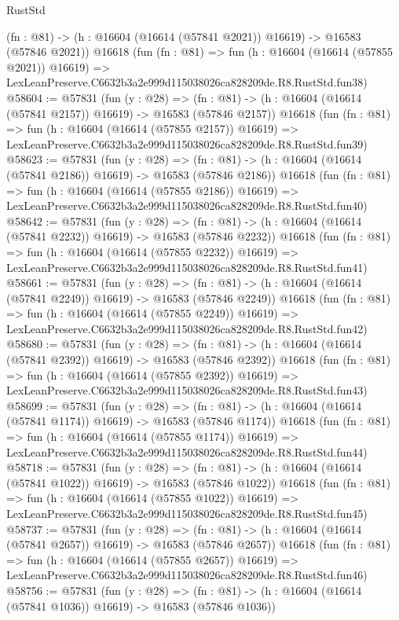 \begin{lexlean}{RustStd}
\begin{coremodule}
    (fn : @81) -> (h : @16604 (@16614 (@57841 @2021)) @16619) -> @16583 (@57846 @2021))
    @16618
    (fun (fn : @81) =>
    fun (h : @16604 (@16614 (@57855 @2021)) @16619) =>
    LexLeanPreserve.C6632b3a2e999d115038026ca828209de.R8.RustStd.fun38)
@58604 := @57831
    (fun (y : @28) =>
    (fn : @81) -> (h : @16604 (@16614 (@57841 @2157)) @16619) -> @16583 (@57846 @2157))
    @16618
    (fun (fn : @81) =>
    fun (h : @16604 (@16614 (@57855 @2157)) @16619) =>
    LexLeanPreserve.C6632b3a2e999d115038026ca828209de.R8.RustStd.fun39)
@58623 := @57831
    (fun (y : @28) =>
    (fn : @81) -> (h : @16604 (@16614 (@57841 @2186)) @16619) -> @16583 (@57846 @2186))
    @16618
    (fun (fn : @81) =>
    fun (h : @16604 (@16614 (@57855 @2186)) @16619) =>
    LexLeanPreserve.C6632b3a2e999d115038026ca828209de.R8.RustStd.fun40)
@58642 := @57831
    (fun (y : @28) =>
    (fn : @81) -> (h : @16604 (@16614 (@57841 @2232)) @16619) -> @16583 (@57846 @2232))
    @16618
    (fun (fn : @81) =>
    fun (h : @16604 (@16614 (@57855 @2232)) @16619) =>
    LexLeanPreserve.C6632b3a2e999d115038026ca828209de.R8.RustStd.fun41)
@58661 := @57831
    (fun (y : @28) =>
    (fn : @81) -> (h : @16604 (@16614 (@57841 @2249)) @16619) -> @16583 (@57846 @2249))
    @16618
    (fun (fn : @81) =>
    fun (h : @16604 (@16614 (@57855 @2249)) @16619) =>
    LexLeanPreserve.C6632b3a2e999d115038026ca828209de.R8.RustStd.fun42)
@58680 := @57831
    (fun (y : @28) =>
    (fn : @81) -> (h : @16604 (@16614 (@57841 @2392)) @16619) -> @16583 (@57846 @2392))
    @16618
    (fun (fn : @81) =>
    fun (h : @16604 (@16614 (@57855 @2392)) @16619) =>
    LexLeanPreserve.C6632b3a2e999d115038026ca828209de.R8.RustStd.fun43)
@58699 := @57831
    (fun (y : @28) =>
    (fn : @81) -> (h : @16604 (@16614 (@57841 @1174)) @16619) -> @16583 (@57846 @1174))
    @16618
    (fun (fn : @81) =>
    fun (h : @16604 (@16614 (@57855 @1174)) @16619) =>
    LexLeanPreserve.C6632b3a2e999d115038026ca828209de.R8.RustStd.fun44)
@58718 := @57831
    (fun (y : @28) =>
    (fn : @81) -> (h : @16604 (@16614 (@57841 @1022)) @16619) -> @16583 (@57846 @1022))
    @16618
    (fun (fn : @81) =>
    fun (h : @16604 (@16614 (@57855 @1022)) @16619) =>
    LexLeanPreserve.C6632b3a2e999d115038026ca828209de.R8.RustStd.fun45)
@58737 := @57831
    (fun (y : @28) =>
    (fn : @81) -> (h : @16604 (@16614 (@57841 @2657)) @16619) -> @16583 (@57846 @2657))
    @16618
    (fun (fn : @81) =>
    fun (h : @16604 (@16614 (@57855 @2657)) @16619) =>
    LexLeanPreserve.C6632b3a2e999d115038026ca828209de.R8.RustStd.fun46)
@58756 := @57831
    (fun (y : @28) =>
    (fn : @81) -> (h : @16604 (@16614 (@57841 @1036)) @16619) -> @16583 (@57846 @1036))

\end{coremodule}
\end{lexlean}
